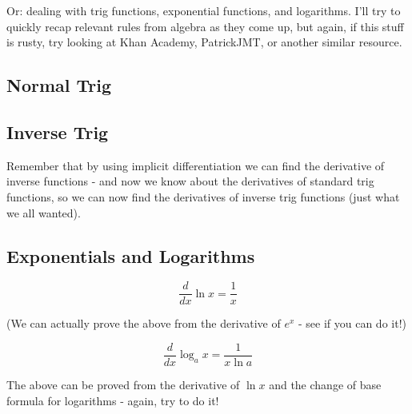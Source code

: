Or: dealing with trig functions, exponential functions, and logarithms. I'll try to quickly recap relevant rules from algebra as they come up, but again, if this stuff is rusty, try looking at Khan Academy, PatrickJMT, or another similar resource.

\subsection{Normal Trig}

\subsection{Inverse Trig}

Remember that by using implicit differentiation we can find the derivative of inverse functions - and now we know about the derivatives of standard trig functions, so we can now find the derivatives of inverse trig functions (just what we all wanted).

\subsection{Exponentials and Logarithms}

\begin{equation*}
    \frac{d}{dx}\ln x = \frac{1}{x}
\end{equation*}

(We can actually prove the above from the derivative of $e^x$ - see if you can do it!)

\begin{equation*}
    \frac{d}{dx}\log_a x = \frac{1}{x \ln a}
\end{equation*}

The above can be proved from the derivative of $\ln x$ and the change of base formula for logarithms - again, try to do it!
